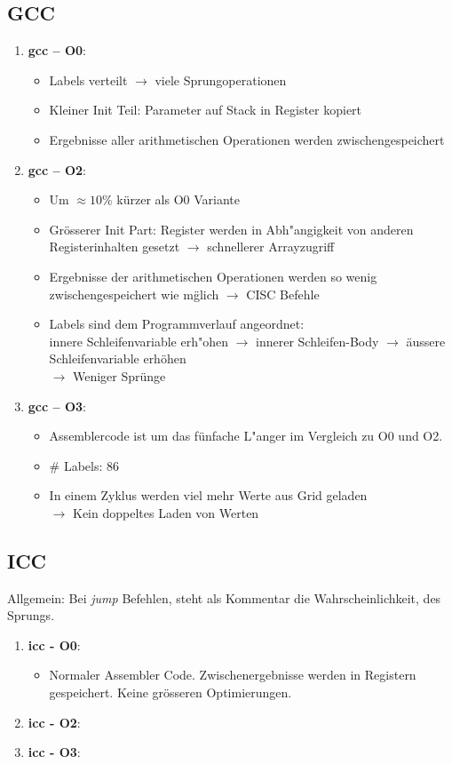 \documentclass{article}
\begin{document}
\subsection*{GCC}
\begin{enumerate}
	\item{ \textbf{gcc -- O0}:
			\begin{itemize}
				\item Labels verteilt $\rightarrow$ viele Sprungoperationen
				\item Kleiner Init Teil: Parameter auf Stack in Register kopiert
				\item Ergebnisse aller arithmetischen Operationen werden zwischengespeichert
			\end{itemize}
		}
	\item{ \textbf{gcc -- O2}:
			\begin{itemize}
				\item Um $\approx 10\%$ k\"urzer als O0 Variante
				\item Gr\"osserer Init Part: Register werden in Abh"angigkeit
					von anderen Registerinhalten gesetzt $\rightarrow$ schnellerer Arrayzugriff
				\item Ergebnisse der arithmetischen Operationen werden so wenig
					zwischengespeichert wie m\"glich $\rightarrow$ CISC Befehle
				\item Labels sind dem Programmverlauf angeordnet:\\
					innere Schleifenvariable erh"ohen $\rightarrow$ innerer Schleifen-Body $\rightarrow$
					\"aussere Schleifenvariable erh\"ohen\\
					$\longrightarrow$ Weniger Spr\"unge
			\end{itemize}
		}
	\item{ \textbf{gcc -- O3}:
			\begin{itemize}
				\item Assemblercode ist um das f\"unfache L"anger im Vergleich
					zu O0 und O2.
				\item \# Labels: 86
				\item In einem Zyklus werden viel mehr Werte aus Grid geladen\\
					$\rightarrow$ Kein doppeltes Laden von Werten
			\end{itemize}
		}
\end{enumerate}
\subsection*{ICC}
Allgemein: Bei \textit{jump} Befehlen, steht als Kommentar die Wahrscheinlichkeit,
des Sprungs.
\begin{enumerate}
	\item{ \textbf{icc - O0}:
			\begin{itemize}
				\item Normaler Assembler Code. Zwischenergebnisse werden in Registern
					gespeichert. Keine gr\"osseren Optimierungen.
			\end{itemize}
		}
	\item{ \textbf{icc - O2}:
		}
	\item{ \textbf{icc - O3}:
		}
\end{enumerate}
\end{document}
